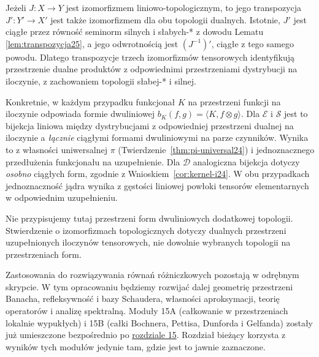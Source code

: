 \begin{uwaga}
\label{rem:kernel-summary25}
Jeżeli $J:X\to Y$ jest izomorfizmem liniowo-topologicznym,
to jego transpozycja $J':Y'\to X'$ jest także
izomorfizmem dla obu topologii dualnych.
Istotnie, $J'$ jest ciągłe przez równość seminorm
silnych i słabych-* z dowodu Lematu~
\ref{lem:transpozycja25}, a jego odwrotnością jest
$(J^{-1})'$, ciągłe z tego samego powodu.
Dlatego transpozycje trzech izomorfizmów tensorowych
identyfikują przestrzenie dualne produktów
z odpowiednimi przestrzeniami dystrybucji na
iloczynie, z zachowaniem topologii słabej-* i silnej.

Konkretnie, w każdym przypadku funkcjonał $K$
na przestrzeni funkcji na iloczynie odpowiada
formie dwuliniowej
$b_K(f,g)=\langle K,f\otimes g\rangle$.
Dla $\mathcal E$ i $\mathcal S$ jest to bijekcja
liniowa między dystrybucjami z odpowiedniej
przestrzeni dualnej na iloczynie a \emph{łącznie}
ciągłymi formami dwuliniowymi na parze czynników.
Wynika to z własności uniwersalnej $\pi$
(Twierdzenie~\ref{thm:pi-universal24}) i jednoznacznego
przedłużenia funkcjonału na uzupełnienie.
Dla $\mathcal D$ analogiczna bijekcja dotyczy
\emph{osobno} ciągłych form, zgodnie z
Wnioskiem~\ref{cor:kernel-i24}.
W obu przypadkach jednoznaczność jądra wynika
z gęstości liniowej powłoki tensorów elementarnych
w odpowiednim uzupełnieniu.

Nie przypisujemy tutaj przestrzeni form dwuliniowych
dodatkowej topologii. Stwierdzenie o izomorfizmach
topologicznych dotyczy dualnych przestrzeni
uzupełnionych iloczynów tensorowych, nie dowolnie
wybranych topologii na przestrzeniach form.
\end{uwaga}

\begin{uwaga}
\label{rem:future25}
Zastosowania do rozwiązywania równań różniczkowych
pozostają w odrębnym skrypcie. W tym opracowaniu
będziemy rozwijać dalej geometrię przestrzeni Banacha,
refleksywność i bazy Schaudera, własności aproksymacji,
teorię operatorów i analizę spektralną.
Moduły 15A (całkowanie w przestrzeniach lokalnie wypukłych)
i 15B (całki Bochnera, Pettisa, Dunforda i Gelfanda)
zostały już umieszczone bezpośrednio po \hyperref[sec:wyzsze-pochodne15]{rozdziale 15}.
Rozdział bieżący korzysta z wyników tych modułów jedynie
tam, gdzie jest to jawnie zaznaczone.
\end{uwaga}
